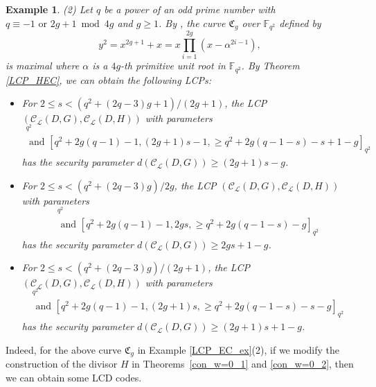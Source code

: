\documentclass[journal,12pt,onecolumn]{IEEEtran}
\newtheorem{example}[theorem]{Example}
\begin{document}
\begin{example}
    {\rm (2)} Let $q$ be a power of an odd prime number with $q\equiv -1 \text{ or } 2g+1 \bmod 4g$ and $g\ge1$. By \cite[Thm. 1]{A_note_on_certain_maximal_hyperelliptic_curves}, the curve $\mathfrak{C}_g$ over $\mathbb{F}_{q^2}$ defined by 
    \[
        y^2 = x^{2g+1}+x = x\prod_{i = 1}^{2g}(x- \alpha^{2i-1}),
    \]
    is maximal where $\alpha$ is a $4g$-th primitive unit root in $\mathbb{F}_{q^2}$. By Theorem \ref{LCP_HEC}, we can obtain the following LCPs:
    \begin{itemize}
        \item For $2\le s <(q^2+(2q-3)g+1)/(2g+1)$, the LCP $(\mathcal{C}_{\mathcal{L}}(D,G),\mathcal{C}_{\mathcal{L}}(D,H))$ with parameters
        \begin{gather*}
            [q^2+2g(q-1)-1,q^2+2g(q-1-s)-s,\ge (2g+1)s-g]_{q^2}\\
            \text{ and }[q^2+2g(q-1)-1,(2g+1)s-1,\ge q^2+2g(q-1-s)-s+1-g]_{q^2}
        \end{gather*}
        has the security parameter $d(\mathcal{C}_{\mathcal{L}}(D,G))\ge (2g+1)s-g$. 
        \item For $2\le s <(q^2+(2q-3)g)/2g$, the LCP $(\mathcal{C}_{\mathcal{L}}(D,G),\mathcal{C}_{\mathcal{L}}(D,H))$ with parameters
        \begin{gather*}
            [q^2+2g(q-1)-1,q^2+2g(q-1-s)-1,\ge 2gs+1-g]_{q^2}\\
            \text{ and }[q^2+2g(q-1)-1,2gs,\ge q^2+2g(q-1-s)-g]_{q^2}
        \end{gather*}
        has the security parameter $d(\mathcal{C}_{\mathcal{L}}(D,G))\ge 2gs+1-g$.
        \item For $2\le s <(q^2+(2q-3)g)/(2g+1)$, the LCP $(\mathcal{C}_{\mathcal{L}}(D,G),\mathcal{C}_{\mathcal{L}}(D,H))$ with parameters
        \begin{gather*}
            [q^2+2g(q-1)-1,q^2+2g(q-1-s)-s-1,\ge (2g+1)s+1-g]_{q^2}\\
            \text{ and }[q^2+2g(q-1)-1,(2g+1)s,\ge q^2+2g(q-1-s)-s-g]_{q^2}
        \end{gather*}
        has the security parameter $d(\mathcal{C}_{\mathcal{L}}(D,G))\ge (2g+1)s+1-g$.
    \end{itemize}
\end{example}

Indeed, for the above curve $\mathfrak{C}_g$ in Example \ref{LCP_EC_ex}(2), if we modify the construction of the divisor $H$ in Theorems~\ref{con_w=0_1} and \ref{con_w=0_2}, then we can obtain some LCD codes.  
\end{document}
